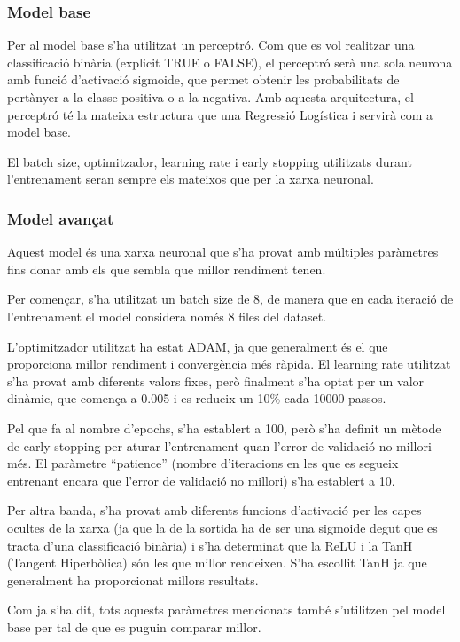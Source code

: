 \subsubsection{Model base}
Per al model base s'ha utilitzat un perceptró. Com que es vol realitzar una classificació binària (explicit TRUE o FALSE), el perceptró serà una sola neurona amb funció d'activació sigmoide, que permet obtenir les probabilitats de pertànyer a la classe positiva o a la negativa. Amb aquesta arquitectura, el perceptró té la mateixa estructura que una Regressió Logística i servirà com a model base.

El batch size, optimitzador, learning rate i early stopping utilitzats durant l'entrenament seran sempre els mateixos que per la xarxa neuronal.

\subsubsection{Model avançat}
Aquest model és una xarxa neuronal que s'ha provat amb múltiples paràmetres fins donar amb els que sembla que millor rendiment tenen. 

Per començar, s'ha utilitzat un batch size de 8, de manera que en cada iteració de l'entrenament el model considera només 8 files del dataset. 

L'optimitzador utilitzat ha estat ADAM, ja que generalment és el que proporciona millor rendiment i convergència més ràpida. El learning rate utilitzat s'ha provat amb diferents valors fixes, però finalment s'ha optat per un valor dinàmic, que comença a 0.005 i es redueix un 10\% cada 10000 passos.

Pel que fa al nombre d'epochs, s'ha establert a 100, però s'ha definit un mètode de early stopping per aturar l'entrenament quan l'error de validació no millori més. El paràmetre ``patience'' (nombre d'iteracions en les que es segueix entrenant encara que l'error de validació no millori) s'ha establert a 10.

Per altra banda, s'ha provat amb diferents funcions d'activació per les capes ocultes de la xarxa (ja que la de la sortida ha de ser una sigmoide degut que es tracta d'una classificació binària) i s'ha determinat que la ReLU i la TanH (Tangent Hiperbòlica) són les que millor rendeixen. S'ha escollit TanH ja que generalment ha proporcionat millors resultats.

Com ja s'ha dit, tots aquests paràmetres mencionats també s'utilitzen pel model base per tal de que es puguin comparar millor.

